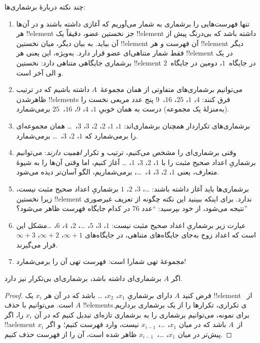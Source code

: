\documentclass[../../../include/open-logic-section]{subfiles}
\begin{document}
\begin{explain}
چند نکته دربارهٔ برشماری‌ها:
\begin{enumerate}
\item تنها فهرست‌هایی را برشماری به شمار می‌آوریم که آغازی داشته باشند و
  در آن‌ها هر !!{element} جز نخستین عضو، دقیقاً یک
  !!{element} داشته باشد که بی‌درنگ پیش از آن بیاید. به بیان دیگر، میان
  نخستین !!{element} آن فهرست و هر !!{element} دیگر فقط شمار متناهی‌ای عضو
  قرار دارد. به‌ویژه، این یعنی هر !!{element} در یک برشماری جایگاهی متناهی
  دارد: نخستین !!{element} در جایگاه~$1$، دومین در جایگاه~$2$ و الی آخر است.
\item می‌توانیم برشماری‌های متفاوتی از همان مجموعهٔ~$A$ داشته باشیم که
  در ترتیب ظاهرشدن !!{element}s فرق کنند: $4$، $1$،
  $25$، $16$،~$9$ پنج عدد مربعی نخست را (به‌منزلهٔ یک مجموعه) درست
  به همان خوبیِ $1$، $4$، $9$، $16$،~$25$ برمی‌شمارد.
\item برشماری‌های تکراردار همچنان برشماری‌اند: $1$، $1$، $2$،
  $2$، $3$، $3$،~\dots{} همان مجموعه‌ای را برمی‌شمارد که $1$، $2$،
  $3$،~\dots{} برمی‌شمارد.
\item وقتی برشماری‌ای را مشخص می‌کنیم، ترتیب و تکرار \emph{اهمیت
  دارند}: می‌توانیم برشماریِ اعداد صحیح مثبت را با $1$، $2$، $3$، $1$،
  \dots{} آغاز کنیم، اما وقتی آن‌ها را به شیوهٔ متعارف، یعنی $1$، $2$،
  $3$، $4$،~\dots، برمی‌شماریم، الگو آسان‌تر دیده می‌شود.
\item برشماری‌ها باید آغاز داشته باشند: \dots، $3$، $2$، $1$ برشماریِ
  اعداد صحیح مثبت نیست، زیرا نخستین !!{element} ندارد. برای اینکه ببینید
  این نکته چگونه از تعریف غیرصوری نتیجه می‌شود، از خود بپرسید: ``عدد 76
  در کدام جایگاه فهرست ظاهر می‌شود؟''
\item عبارت زیر برشماریِ اعداد صحیح مثبت نیست:
  $1$، $3$، $5$، \dots، $2$، $4$، $6$، \dots\@ مشکل این است که
  اعداد زوج به‌جای جایگاه‌های متناهی، در جایگاه‌های $\infty + 1$،
  $\infty + 2$، $\infty +
  3$ قرار می‌گیرند.
\item مجموعهٔ تهی شمارا است: فهرست تهی آن را برمی‌شمارد!{}
\end{enumerate}
\end{explain}

\begin{prop}
  اگر $A$ برشماری‌ای داشته باشد، برشماری‌ای بی‌تکرار نیز دارد.
\end{prop}

\begin{proof}
  فرض کنید $A$ دارای برشماریِ $x_1$، $x_2$، \dots{} باشد که در آن هر
  $x_i$ یک !!{element} از~$A$ است. می‌توانیم با حذف !!{element}sی تکراری،
  تکرارها را از یک برشماری برداریم. برای نمونه، می‌توانیم برشماری را به
  برشماری تازه‌ای تبدیل کنیم که در آن $x_i$ را، اگر !!a{element} از~$A$
  باشد که در میان $x_1$، \dots، $x_{i-1}$ نیست، وارد فهرست کنیم؛ و اگر
  $x_i$ پیش‌تر در میان $x_1$، \dots،~$x_{i-1}$ ظاهر شده است، آن را از
  فهرست حذف کنیم.
\end{proof}
\end{document}
